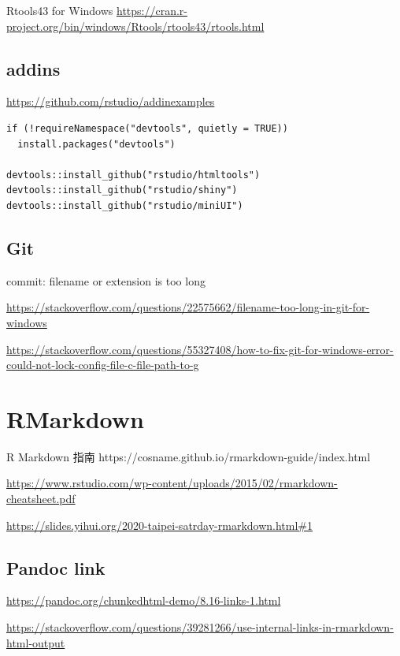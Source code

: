 \documentclass[
]{book}
\theoremstyle{definition}
\theoremstyle{definition}
\theoremstyle{definition}
\theoremstyle{definition}
\theoremstyle{remark}
\begin{document}
Rtools43 for Windows
\url{https://cran.r-project.org/bin/windows/Rtools/rtools43/rtools.html}

\subsection{addins}\label{addins}

\url{https://github.com/rstudio/addinexamples}

\begin{verbatim}
if (!requireNamespace("devtools", quietly = TRUE))
  install.packages("devtools")
  
devtools::install_github("rstudio/htmltools")
devtools::install_github("rstudio/shiny")
devtools::install_github("rstudio/miniUI")
\end{verbatim}

\subsection{Git}\label{git}

commit: filename or extension is too long

\url{https://stackoverflow.com/questions/22575662/filename-too-long-in-git-for-windows}

\url{https://stackoverflow.com/questions/55327408/how-to-fix-git-for-windows-error-could-not-lock-config-file-c-file-path-to-g}

\section{RMarkdown}\label{rmarkdown}

\begin{CJK}{UTF8}{bsmi}
R Markdown 指南 https://cosname.github.io/rmarkdown-guide/index.html
\end{CJK}

\url{https://www.rstudio.com/wp-content/uploads/2015/02/rmarkdown-cheatsheet.pdf}

\url{https://slides.yihui.org/2020-taipei-satrday-rmarkdown.html\#1}

\subsection{Pandoc link}\label{pandoc-link}

\url{https://pandoc.org/chunkedhtml-demo/8.16-links-1.html}

\url{https://stackoverflow.com/questions/39281266/use-internal-links-in-rmarkdown-html-output}
\end{document}
